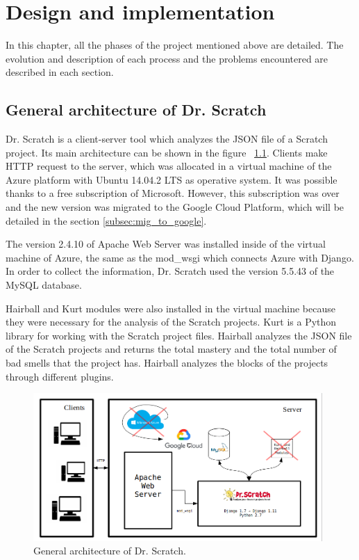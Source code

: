 

\cleardoublepage
\chapter{Design and implementation}
\label{implementation}

In this chapter, all the phases of the project mentioned above are detailed. The evolution and description of each process and the problems encountered are described in each section.


\section{General architecture of Dr. Scratch} 
\label{sec:arquitectura}

Dr. Scratch is a client-server tool which analyzes the JSON file of a Scratch project. Its main architecture can be shown in the figure ~\ref{fig:architecture}. Clients make HTTP request to the server, which was allocated in a virtual machine of the Azure platform with Ubuntu 14.04.2 LTS as operative system. It was possible thanks to a free subscription of Microsoft. However, this subscription was over and the new version was migrated to the Google Cloud Platform, which will be detailed in the section \ref{subsec:mig_to_google}. 

The version 2.4.10 of Apache Web Server was installed inside of the virtual machine of Azure, the same as the mod\_wsgi which connects Azure with Django. In order to collect the information, Dr. Scratch used the version 5.5.43 of the MySQL database. 

Hairball and Kurt modules were also installed in the virtual machine because they were necessary for the analysis of the Scratch projects. Kurt is a Python library for working with the Scratch project files. Hairball analyzes the JSON file of the Scratch projects and returns the total mastery and the total number of bad smells that the project has. Hairball analyzes the blocks of the projects through different plugins.

 \begin{figure}
    \centering
    \includegraphics[width=11cm,                         keepaspectratio]{img/Client_Server.png}
    \caption{General architecture of Dr. Scratch.}
    \label{fig:architecture}
\end{figure}



